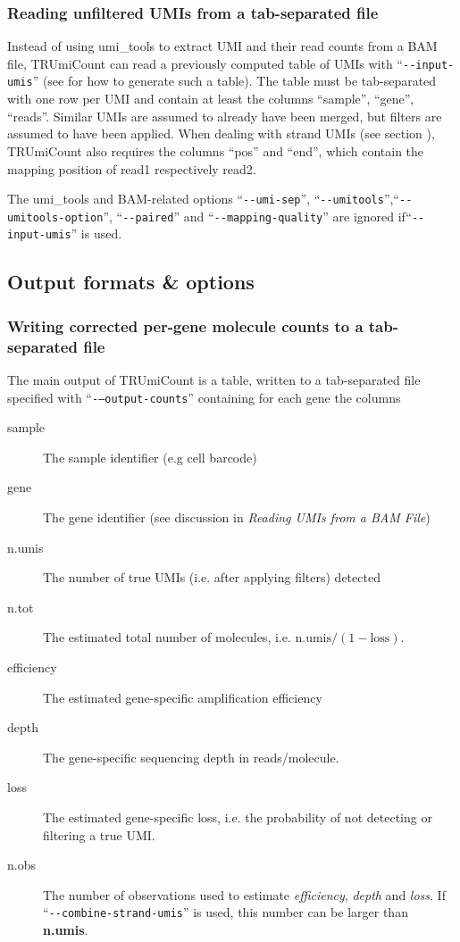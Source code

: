 \documentclass[10pt]{article}
\makeatletter
\newcommand{\ddarg}[1]{\texttt{-{}-#1}}
\DeclareRobustCommand*{\nameref}[1]{%
      \textit{\my@nameref{#1}}%
    }%
\makeatother
\begin{document}
\subsubsection*{Reading unfiltered UMIs from a tab-separated file}

Instead of using umi\_tools to extract UMI and their read counts from a BAM file, TRUmiCount can read a previously computed table of UMIs with ``\ddarg{input-umis}'' (see \nameref{output-options} for how to generate such a table). The table must be tab-separated with one row per UMI and contain at least the columns ``sample'', ``gene'', ``reads''. Similar UMIs are assumed to already have been merged, but filters are assumed to have been applied. When dealing with strand UMIs (see section \nameref{strand-umis}), TRUmiCount also requires the columns ``pos'' and ``end'', which contain the mapping position of read1 respectively read2.

The umi\_tools and BAM-related options ``\ddarg{umi-sep}'', ``\ddarg{umitools}'',\linebreak ``\ddarg{umitools-option}'', ``\ddarg{paired}'' and ``\ddarg{mapping-quality}'' are ignored if\linebreak ``\ddarg{input-umis}'' is used.

\subsection{Output formats \& options}\label{output-options}

\subsubsection*{Writing corrected per-gene molecule counts to a tab-separated file}

The main output of TRUmiCount is a table, written to a tab-separated file specified with ``\ddarg{--output-counts}'' containing for each gene the columns
\begin{description}
\item[sample] The sample identifier (e.g cell barcode)
\item[gene] The gene identifier (see discussion in \textit{Reading UMIs from a BAM File})
\item[n.umis] The number of true UMIs (i.e. after applying filters) detected
\item[n.tot] The estimated total number of molecules, i.e. $\textrm{n.umis} / (1 - \textrm{loss})$.
\item[efficiency] The estimated gene-specific amplification efficiency
\item[depth] The gene-specific sequencing depth in reads/molecule.
\item[loss] The estimated gene-specific loss, i.e. the probability of not detecting or filtering a true UMI. 
\item[n.obs] The number of observations used to estimate \textit{efficiency}, \textit{depth} and \textit{loss}. If ``\ddarg{combine-strand-umis}'' is used, this number can be larger than \textbf{n.umis}.
\end{description}
\end{document}

